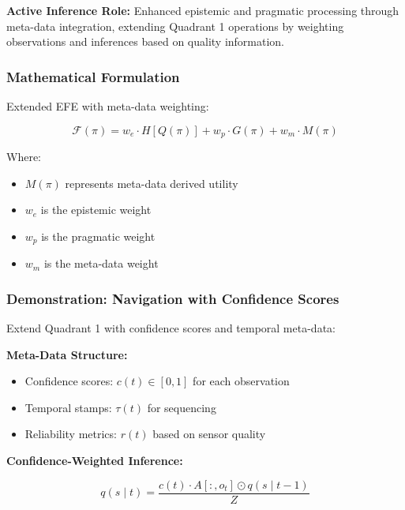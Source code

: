 \documentclass[
]{article}
\providecommand{\tightlist}{%
  \setlength{\itemsep}{0pt}\setlength{\parskip}{0pt}}
\begin{document}
\textbf{Active Inference Role:} Enhanced epistemic and pragmatic
processing through meta-data integration, extending Quadrant 1
operations by weighting observations and inferences based on quality
information.

\subsubsection{Mathematical
Formulation}\label{mathematical-formulation-1}

Extended EFE with meta-data weighting:

\begin{equation}
\mathcal{F}(\pi) = w_e \cdot H[Q(\pi)] + w_p \cdot G(\pi) + w_m \cdot M(\pi)
\label{eq:efe_metadata}
\end{equation}

Where:

\begin{itemize}
\tightlist
\item
  \(M(\pi)\) represents meta-data derived utility
\item
  \(w_e\) is the epistemic weight
\item
  \(w_p\) is the pragmatic weight
\item
  \(w_m\) is the meta-data weight
\end{itemize}

\subsubsection{Demonstration: Navigation with Confidence
Scores}\label{demonstration-navigation-with-confidence-scores}

Extend Quadrant 1 with confidence scores and temporal meta-data:

\textbf{Meta-Data Structure:}

\begin{itemize}
\tightlist
\item
  Confidence scores: \(c(t) \in [0,1]\) for each observation
\item
  Temporal stamps: \(\tau(t)\) for sequencing
\item
  Reliability metrics: \(r(t)\) based on sensor quality
\end{itemize}

\textbf{Confidence-Weighted Inference:}

\begin{equation}
q(s \mid t) = \frac{c(t) \cdot A[:,o_t] \odot q(s \mid t-1)}{Z}
\label{eq:confidence_weighted_inference}
\end{equation}
\end{document}
